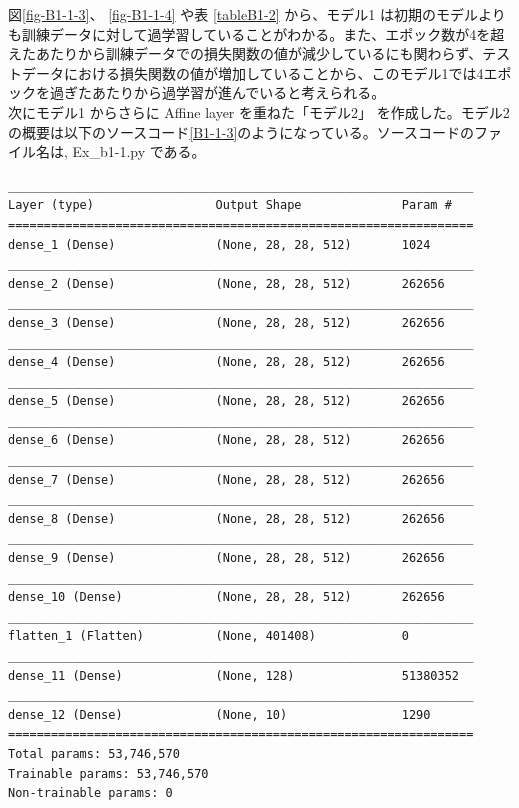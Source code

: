 \documentclass[a4paper,dvipdfmx]{jsarticle}
\begin{document}
図\ref{fig-B1-1-3}、 \ref{fig-B1-1-4} や表 \ref{tableB1-2} から、モデル1 は初期のモデルよりも訓練データに対して過学習していることがわかる。また、エポック数が4を超えたあたりから訓練データでの損失関数の値が減少しているにも関わらず、テストデータにおける損失関数の値が増加していることから、このモデル1では4エポックを過ぎたあたりから過学習が進んでいると考えられる。\\

次にモデル1 からさらに Affine layer を重ねた「モデル2」 を作成した。モデル2 の概要は以下のソースコード\ref{B1-1-3}のようになっている。ソースコードのファイル名は, Ex\_b1-1.py である。

\begin{lstlisting}[caption="作成したモデル 2 (Ex\_b1-1.py)",label=B1-1-3]
_________________________________________________________________
Layer (type)                 Output Shape              Param #
=================================================================
dense_1 (Dense)              (None, 28, 28, 512)       1024
_________________________________________________________________
dense_2 (Dense)              (None, 28, 28, 512)       262656
_________________________________________________________________
dense_3 (Dense)              (None, 28, 28, 512)       262656
_________________________________________________________________
dense_4 (Dense)              (None, 28, 28, 512)       262656
_________________________________________________________________
dense_5 (Dense)              (None, 28, 28, 512)       262656
_________________________________________________________________
dense_6 (Dense)              (None, 28, 28, 512)       262656
_________________________________________________________________
dense_7 (Dense)              (None, 28, 28, 512)       262656
_________________________________________________________________
dense_8 (Dense)              (None, 28, 28, 512)       262656
_________________________________________________________________
dense_9 (Dense)              (None, 28, 28, 512)       262656
_________________________________________________________________
dense_10 (Dense)             (None, 28, 28, 512)       262656
_________________________________________________________________
flatten_1 (Flatten)          (None, 401408)            0
_________________________________________________________________
dense_11 (Dense)             (None, 128)               51380352
_________________________________________________________________
dense_12 (Dense)             (None, 10)                1290
=================================================================
Total params: 53,746,570
Trainable params: 53,746,570
Non-trainable params: 0
\end{lstlisting}
\end{document}
